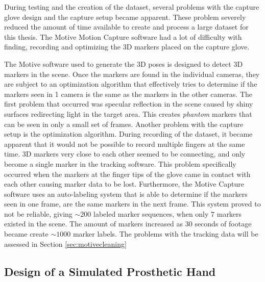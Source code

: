 \documentclass[../main.tex]{subfiles}
\begin{document}
During testing and the creation of the dataset, several problems with the capture glove design and the capture setup became apparent.
These problem severely reduced the amount of time available to create and process a large dataset for this thesis.
The Motive Motion Capture software \cite{motive} had a lot of difficulty with finding, recording and optimizing the 3D markers placed on the capture glove.

The  Motive software used to generate the 3D poses is designed to detect 3D markers in the scene.
Once the markers are found in the individual cameras, they are subject to an optimization algorithm that effectively tries to determine if the markers seen in 1 camera is the same as the markers in the other cameras.
The first problem that occurred was \gls{specular reflection} in the scene caused by shiny surfaces redirecting light in the target area.
This creates \textit{phantom} markers that can be seen in only a small set of frames.
Another problem with the capture setup is the optimization algorithm.
During recording of the dataset, it became apparent that it would not be possible to record multiple fingers at the same time.
3D markers very close to each other seemed to be connecting, and only become a single marker in the tracking software.
This problem specifically occurred when the markers at the finger tips of the glove came in contact with each other causing marker data to be lost.
Furthermore, the Motive Capture software uses an auto-labeling system that is able to determine if the markers seen in one frame, are the same markers in the next frame.
This system proved to not be reliable, giving $\sim 200$ labeled marker sequences, when only $7$ markers existed in the scene.
The amount of markers increased as 30 seconds of footage became create $\sim 1000$ marker labels.
The problems with the tracking data will be assessed in Section \ref{sec:motivecleaning}

\subsection{Design of a Simulated Prosthetic Hand}
\label{sec:prost_sim}
\end{document}
